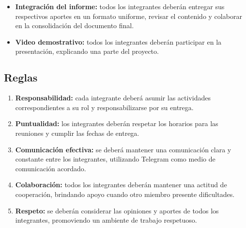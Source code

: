 \documentclass[12pt,a4paper]{article}
\begin{document}
\begin{itemize}
    \item \textbf{Integración del informe:} todos los integrantes deberán entregar sus respectivos aportes en un formato uniforme, revisar el contenido y colaborar en la consolidación del documento final.

    \item \textbf{Video demostrativo:} todos los integrantes deberán participar en la presentación, explicando una parte del proyecto.
\end{itemize}


\subsection{Reglas}

\begin{enumerate}[label=\textbf{R\arabic*.}, leftmargin=*]

    \item \textbf{Responsabilidad:} cada integrante deberá asumir las actividades correspondientes a su rol y responsabilizarse por su entrega.

    \item \textbf{Puntualidad:} los integrantes deberán respetar los horarios para las reuniones y cumplir las fechas de entrega.

    \item \textbf{Comunicación efectiva:} se deberá mantener una comunicación clara y  constante entre los integrantes, utilizando Telegram como medio de comunicación acordado.

    \item \textbf{Colaboración:} todos los integrantes deberán mantener una actitud de cooperación, brindando apoyo cuando otro miembro presente dificultades.

    \item \textbf{Respeto:} se deberán considerar las opiniones y aportes de todos los integrantes, promoviendo un ambiente de trabajo respetuoso.
\end{enumerate}
\end{document}
